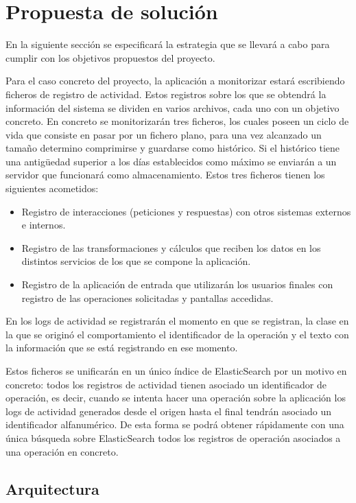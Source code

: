 \chapter{Propuesta de solución}

En la siguiente sección se especificará la estrategia que se llevará a cabo para cumplir con los objetivos propuestos del proyecto.

Para el caso concreto del proyecto, la aplicación a monitorizar estará escribiendo ficheros de registro de actividad. Estos registros sobre los que se obtendrá la información del sistema se dividen en varios archivos, cada uno con un objetivo concreto. En concreto se monitorizarán tres ficheros, los cuales poseen un ciclo de vida que consiste en pasar por un fichero plano, para una vez alcanzado un tamaño determino comprimirse y guardarse como histórico. Si el histórico tiene una antigüedad superior a los días establecidos como máximo se enviarán a un servidor que funcionará como almacenamiento. Estos tres ficheros tienen los siguientes acometidos:

\begin{itemize}
\item Registro de interacciones (peticiones y respuestas) con otros sistemas externos e internos.
\item Registro de las transformaciones y cálculos que reciben los datos en los distintos servicios de los que se compone la aplicación.
\item Registro de la aplicación de entrada que utilizarán los usuarios finales con registro de las operaciones solicitadas y pantallas accedidas.
\end{itemize}

En los logs de actividad se registrarán el momento en que se registran, la clase en la que se originó el comportamiento el identificador de la operación y el texto con la información que se está registrando en ese momento. 

Estos ficheros se unificarán en un único índice de ElasticSearch por un motivo en concreto: todos los registros de actividad tienen asociado un identificador de operación, es decir, cuando se intenta hacer una operación sobre la aplicación los logs de actividad generados desde el origen hasta el final tendrán asociado un identificador alfanumérico. De esta forma se podrá obtener rápidamente con una única búsqueda sobre ElasticSearch todos los registros de operación asociados a una operación en concreto.

\section{Arquitectura}


